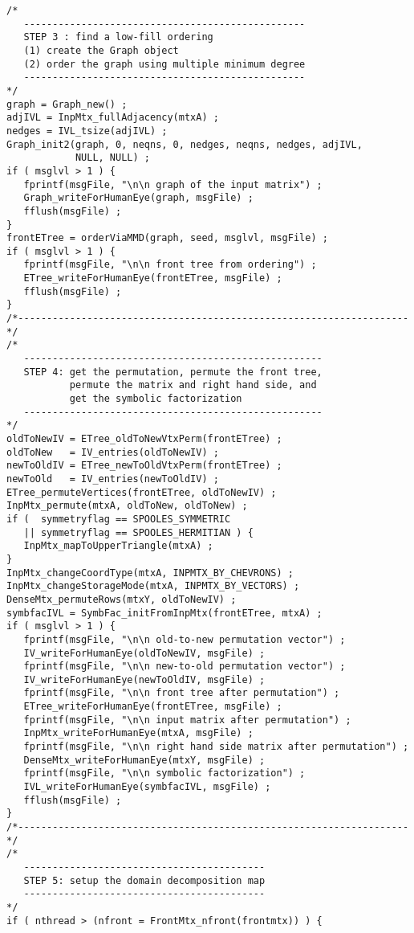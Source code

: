 \begin{verbatim}
/*
   -------------------------------------------------
   STEP 3 : find a low-fill ordering
   (1) create the Graph object
   (2) order the graph using multiple minimum degree
   -------------------------------------------------
*/
graph = Graph_new() ;
adjIVL = InpMtx_fullAdjacency(mtxA) ;
nedges = IVL_tsize(adjIVL) ;
Graph_init2(graph, 0, neqns, 0, nedges, neqns, nedges, adjIVL,
            NULL, NULL) ;
if ( msglvl > 1 ) {
   fprintf(msgFile, "\n\n graph of the input matrix") ;
   Graph_writeForHumanEye(graph, msgFile) ;
   fflush(msgFile) ;
}
frontETree = orderViaMMD(graph, seed, msglvl, msgFile) ;
if ( msglvl > 1 ) {
   fprintf(msgFile, "\n\n front tree from ordering") ;
   ETree_writeForHumanEye(frontETree, msgFile) ;
   fflush(msgFile) ;
}
/*--------------------------------------------------------------------*/
/*
   ----------------------------------------------------
   STEP 4: get the permutation, permute the front tree,
           permute the matrix and right hand side, and
           get the symbolic factorization
   ----------------------------------------------------
*/
oldToNewIV = ETree_oldToNewVtxPerm(frontETree) ;
oldToNew   = IV_entries(oldToNewIV) ;
newToOldIV = ETree_newToOldVtxPerm(frontETree) ;
newToOld   = IV_entries(newToOldIV) ;
ETree_permuteVertices(frontETree, oldToNewIV) ;
InpMtx_permute(mtxA, oldToNew, oldToNew) ;
if (  symmetryflag == SPOOLES_SYMMETRIC
   || symmetryflag == SPOOLES_HERMITIAN ) {
   InpMtx_mapToUpperTriangle(mtxA) ;
}
InpMtx_changeCoordType(mtxA, INPMTX_BY_CHEVRONS) ;
InpMtx_changeStorageMode(mtxA, INPMTX_BY_VECTORS) ;
DenseMtx_permuteRows(mtxY, oldToNewIV) ;
symbfacIVL = SymbFac_initFromInpMtx(frontETree, mtxA) ;
if ( msglvl > 1 ) {
   fprintf(msgFile, "\n\n old-to-new permutation vector") ;
   IV_writeForHumanEye(oldToNewIV, msgFile) ;
   fprintf(msgFile, "\n\n new-to-old permutation vector") ;
   IV_writeForHumanEye(newToOldIV, msgFile) ;
   fprintf(msgFile, "\n\n front tree after permutation") ;
   ETree_writeForHumanEye(frontETree, msgFile) ;
   fprintf(msgFile, "\n\n input matrix after permutation") ;
   InpMtx_writeForHumanEye(mtxA, msgFile) ;
   fprintf(msgFile, "\n\n right hand side matrix after permutation") ;
   DenseMtx_writeForHumanEye(mtxY, msgFile) ;
   fprintf(msgFile, "\n\n symbolic factorization") ;
   IVL_writeForHumanEye(symbfacIVL, msgFile) ;
   fflush(msgFile) ;
}
/*--------------------------------------------------------------------*/
/*
   ------------------------------------------
   STEP 5: setup the domain decomposition map
   ------------------------------------------
*/
if ( nthread > (nfront = FrontMtx_nfront(frontmtx)) ) {

\end{verbatim}
